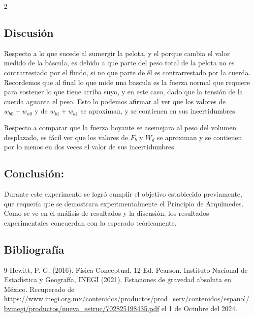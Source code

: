 \documentclass[10pt,letterpaper]{article}
\begin{document}
    \hline

    \begin{multicols}{2}
    
        \subsection{Discusión}

        Respecto a lo que sucede al sumergir la pelota, y el porque cambia el valor medido de la báscula, es debido a que parte del peso total de la pelota no es contrarrestado por el fluido, si no que parte de él es contrarrestado por la cuerda. Recordemos que al final lo que mide una bascula es la fuerza normal que requiere para sostener lo que tiene arriba suyo, y en este caso, dado que la tensión de la cuerda aguanta el peso. Esto lo podemos afirmar al ver que los valores de $w_{b0} + w_{a0}$ y de $w_{b1} + w_{a1}$ se aproximan, y se contienen en sus incertidumbres. 

        Respecto a comparar que la fuerza boyante se asemejara al peso del volumen desplazado, es fácil ver que los valores de $F_b$ y $W_d$ se aproximan y se contienen por lo menos en dos veces el valor de sus incertidumbres.


 
        \subsection{Conclusión: }

        Durante este experimento se logró cumplir el objetivo establecido previamente, que requería que se demostrara experimentalmente el Principio de Arquímedes. Como se ve en el análisis de resultados y la discusión, los resultados experimentales concuerdan con lo esperado teóricamente.

        \subsection{Bibliografía}
    
        \begin{thebibliography}{9}
         Hewitt, P. G. (2016). Física Conceptual. 12 Ed. Pearson.
         Instituto Nacional de Estadística y Geografía, INEGI (2021). Estaciones de gravedad absoluta en México. Recuperado de \url{https://www.inegi.org.mx/contenidos/productos/prod_serv/contenidos/espanol/bvinegi/productos/nueva_estruc/702825198435.pdf} el 1 de Octubre del 2024.

        \end{thebibliography}


    \end{multicols}
            
    \hline

    \vspace{1cm}

  
	
\end{document}
